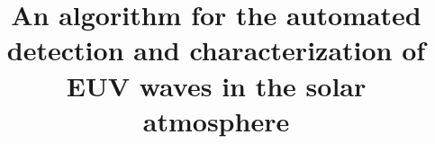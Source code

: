 \documentclass[12pt]{iopart}
\begin{document}
\title{An algorithm for the automated detection and characterization
  of EUV waves in the solar atmosphere}





\maketitle














{}
\end{document}
